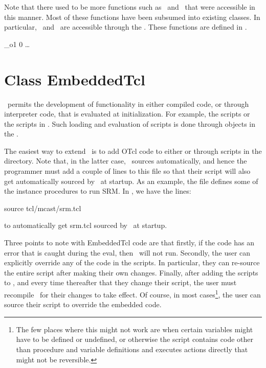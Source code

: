 Note that there used to be more functions such as \ and
\ that were accessible in this manner.
Most of these functions have been subsumed into existing classes.
In particular, \ and \ are accessible
through the
.
These functions are defined in .
\begin{program}
            _o1
            0
            \ldots
\end{program}
          

\section{Class EmbeddedTcl}
\label{sec:EmbeddedTcl}

\ns\ permits the development of functionality in either compiled code,
or through interpreter code, that is evaluated at initialization.
For example, the scripts  or the scripts in
.
Such loading and evaluation of scripts is done through objects in the
.

The easiest way to extend \ns\ is to add OTcl code
to either  or through scripts
in the  directory.
Note that, in the latter case, \ns\ sources
 automatically, and hence
the programmer must add a couple of lines to this file
so that their script will also get automatically sourced by \ns\
at startup.
As an example,
the file  defines some of the instance procedures
to run SRM.
In , we have the lines:
\begin{program}
        source tcl/mcast/srm.tcl
\end{program}
to automatically get srm.tcl sourced by \ns\ at startup.

Three points to note with EmbeddedTcl code are that
firstly, if the code has an error that is caught during the eval,
then \ns\ will not run.
Secondly, the user can explicitly override any of the code in the scripts.
In particular, they can re-source the entire script after making their own
changes. 
Finally, after adding the scripts to , and
every time thereafter that they change their script, the user
must recompile \ns\ for their changes to take effect.
Of course, in most cases\footnote{%
The few places where this might not work
are when certain variables might have to be defined or undefined,
or otherwise the script contains code
other than procedure and variable definitions and 
executes actions directly that might not be reversible.},
the user can source their script
to override the embedded code.


